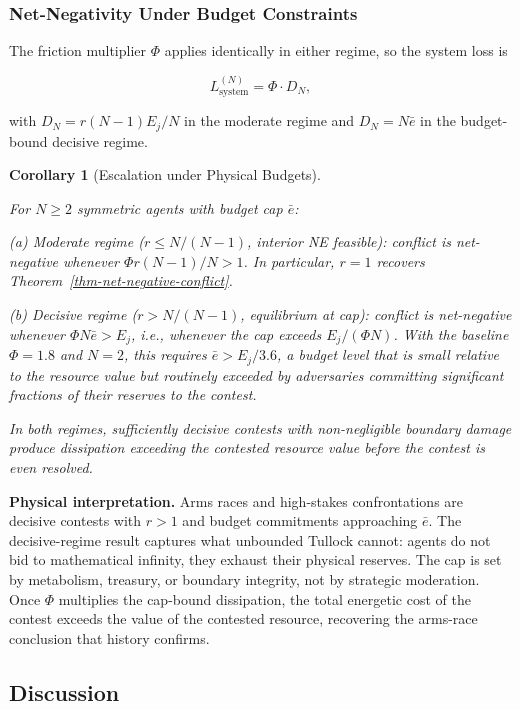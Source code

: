\documentclass[11pt]{article}
\theoremstyle{plain}
\newtheorem{corollary}[theorem]{Corollary}
\theoremstyle{definition}
\theoremstyle{remark}
\let\origsubsection\subsection
\renewcommand{\subsection}{\needspace{7\baselineskip}\origsubsection}
\let\origsubsubsection\subsubsection
\renewcommand{\subsubsection}{\needspace{4\baselineskip}\origsubsubsection}
\begin{document}
\subsubsection{Net-Negativity Under Budget
Constraints}\label{net-negativity-under-budget-constraints}

The friction multiplier \(\Phi\) applies identically in either regime,
so the system loss is

\[L_{\text{system}}^{(N)} = \Phi \cdot D_N,\]

with \(D_N = r(N-1) E_j/N\) in the moderate regime and
\(D_N = N \bar e\) in the budget-bound decisive regime.

\begin{corollary}[Escalation under Physical Budgets]
\label{cor-escalation-instability}

For $N \geq 2$ symmetric agents with budget cap $\bar e$:

(a) \emph{Moderate regime} ($r \leq N/(N-1)$, interior NE feasible): conflict is net-negative whenever $\Phi r (N-1)/N > 1$. In particular, $r = 1$ recovers Theorem~\ref{thm-net-negative-conflict}.

(b) \emph{Decisive regime} ($r > N/(N-1)$, equilibrium at cap): conflict is net-negative whenever $\Phi N \bar e > E_j$, i.e., whenever the cap exceeds $E_j/(\Phi N)$. With the baseline $\Phi = 1.8$ and $N = 2$, this requires $\bar e > E_j/3.6$, a budget level that is small relative to the resource value but routinely exceeded by adversaries committing significant fractions of their reserves to the contest.

In both regimes, sufficiently decisive contests with non-negligible boundary damage produce dissipation exceeding the contested resource value before the contest is even resolved.
\end{corollary}

\textbf{Physical interpretation.} Arms races and high-stakes
confrontations are decisive contests with \(r > 1\) and budget
commitments approaching \(\bar e\). The decisive-regime result captures
what unbounded Tullock cannot: agents do not bid to mathematical
infinity, they exhaust their physical reserves. The cap is set by
metabolism, treasury, or boundary integrity, not by strategic
moderation. Once \(\Phi\) multiplies the cap-bound dissipation, the
total energetic cost of the contest exceeds the value of the contested
resource, recovering the arms-race conclusion that history confirms.

\subsection{Discussion}\label{discussion-3}
\end{document}
